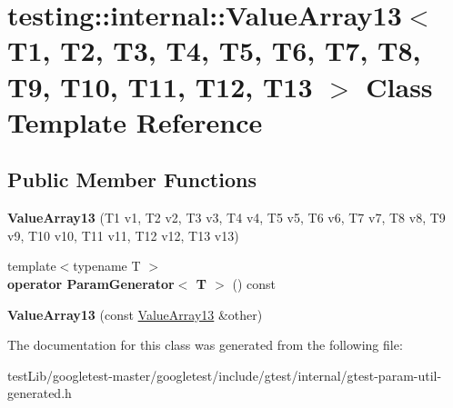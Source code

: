 \hypertarget{classtesting_1_1internal_1_1ValueArray13}{}\section{testing\+:\+:internal\+:\+:Value\+Array13$<$ T1, T2, T3, T4, T5, T6, T7, T8, T9, T10, T11, T12, T13 $>$ Class Template Reference}
\label{classtesting_1_1internal_1_1ValueArray13}
\subsection*{Public Member Functions}
\begin{DoxyCompactItemize}
\item 
\mbox{\label{classtesting_1_1internal_1_1ValueArray13_a57505ac7a4fbb86f4121bf1d41b0352d}} 
{\bfseries Value\+Array13} (T1 v1, T2 v2, T3 v3, T4 v4, T5 v5, T6 v6, T7 v7, T8 v8, T9 v9, T10 v10, T11 v11, T12 v12, T13 v13)
\item 
\mbox{\label{classtesting_1_1internal_1_1ValueArray13_a80572fc9c66a20824ae0934785b41f24}} 
{\footnotesize template$<$typename T $>$ }\\{\bfseries operator Param\+Generator$<$ T $>$} () const
\item 
\mbox{\label{classtesting_1_1internal_1_1ValueArray13_a150575c5629d3a589bf2baba0371b1da}} 
{\bfseries Value\+Array13} (const \hyperlink{classtesting_1_1internal_1_1ValueArray13}{Value\+Array13} \&other)
\end{DoxyCompactItemize}


The documentation for this class was generated from the following file\+:\begin{DoxyCompactItemize}
\item 
test\+Lib/googletest-\/master/googletest/include/gtest/internal/gtest-\/param-\/util-\/generated.\+h\end{DoxyCompactItemize}
